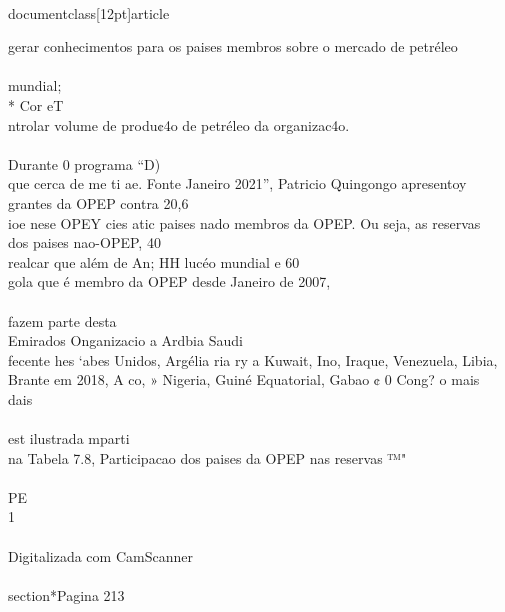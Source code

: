 \\documentclass[12pt]{article}
\begin{document}
gerar conhecimentos para os paises membros sobre o mercado de petréleo\\
\\
mundial;\\
* Cor eT\\
ntrolar volume de produ¢4o de petréleo da organizac4o.\\
\\
Durante 0 programa “D)\\
que cerca de me ti ae. Fonte Janeiro 2021”, Patricio Quingongo apresentoy\\
grantes da OPEP contra 20,6\\%
ioe nese OPEY cies atic paises nado membros da OPEP. Ou seja, as reservas\\
dos paises nao-OPEP, 40\\%
realcar que além de An; HH lucéo mundial e 60\\%
gola que é membro da OPEP desde Janeiro de 2007,\\
\\
fazem parte desta\\
Emirados Onganizacio a Ardbia Saudi\\
fecente hes ‘abes Unidos, Argélia ria ry a Kuwait, Ino, Iraque, Venezuela, Libia,\\
Brante em 2018, A co, » Nigeria, Guiné Equatorial, Gabao ¢ 0 Cong? o mais\\
dais\\
\\
est ilustrada mparti\\
na Tabela 7.8, Participacao dos paises da OPEP nas reservas ™"\\
\\
PE\\
1\\
\\
Digitalizada com CamScanner\\

\\section*{Pagina 213}
\end{document}

